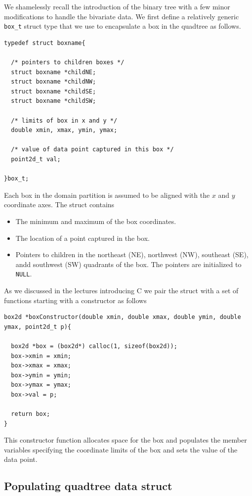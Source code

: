 We shamelessly recall the introduction of the binary tree with a few minor modifications to handle the bivariate data. We first define a relatively generic \texttt{box\_t} struct type that we use to encapsulate a box in the quadtree as follows.
\begin{verbatim}
typedef struct boxname{

  /* pointers to children boxes */
  struct boxname *childNE;
  struct boxname *childNW;
  struct boxname *childSE;
  struct boxname *childSW;

  /* limits of box in x and y */
  double xmin, xmax, ymin, ymax;

  /* value of data point captured in this box */
  point2d_t val;

}box_t;
\end{verbatim}

Each box in the domain partition is assumed to be aligned with the $x$ and $y$ coordinate axes. The struct contains
\begin{itemize}
    \item The minimum and maximum of the box coordinates.
    \item The location of a point captured in the box.
    \item Pointers to children in the northeast (NE), northwest (NW), southeast (SE), andd southwest (SW) quadrants of the box. The pointers are initialized to \texttt{NULL}. 
\end{itemize} 

As we  discussed in the lectures introducing C we pair the struct with a set of functions starting with a constructor as follows
\begin{verbatim}
box2d *boxConstructor(double xmin, double xmax, double ymin, double ymax, point2d_t p){

  box2d *box = (box2d*) calloc(1, sizeof(box2d));
  box->xmin = xmin;
  box->xmax = xmax;
  box->ymin = ymin;
  box->ymax = ymax;
  box->val = p;

  return box;
}
\end{verbatim}
This constructor function allocates space for the box and populates the member variables specifying the coordinate limits of the box and sets the value of the data point. 


\subsection{Populating quadtree data struct}


